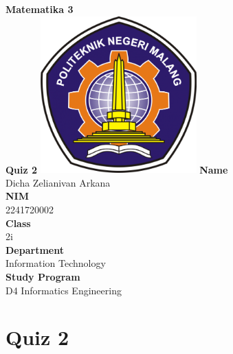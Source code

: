 \documentclass[12pt,titlepage]{article}
\newcommand{\vSubject}{Matematika 3}
\newcommand{\vSubtitle}{Quiz 2}
\newcommand{\vName}{Dicha Zelianivan Arkana}
\newcommand{\vNIM}{2241720002}
\newcommand{\vClass}{2i}
\newcommand{\vDepartment}{Information Technology}
\newcommand{\vStudyProgram}{D4 Informatics Engineering}
\begin{document}
\begin{titlepage}
    \centering
    \vfill
    {\bfseries\LARGE
        \vSubject\\
        \vskip0.25cm
        \vSubtitle
    }
    \vfill
    \includegraphics[width=6cm]{images/polinema-logo.png}
    \vfill
    {
        \textbf{Name}\\
        \vName\\
        \vskip0.5cm
        \textbf{NIM}\\
        \vNIM\\
        \vskip0.5cm
        \textbf{Class}\\
        \vClass\\
        \vskip0.5cm
        \textbf{Department}\\
        \vDepartment\\
        \vskip0.5cm
        \textbf{Study Program}\\
        \vStudyProgram
    }
\end{titlepage}

\section*{Quiz 2}
\end{document}
